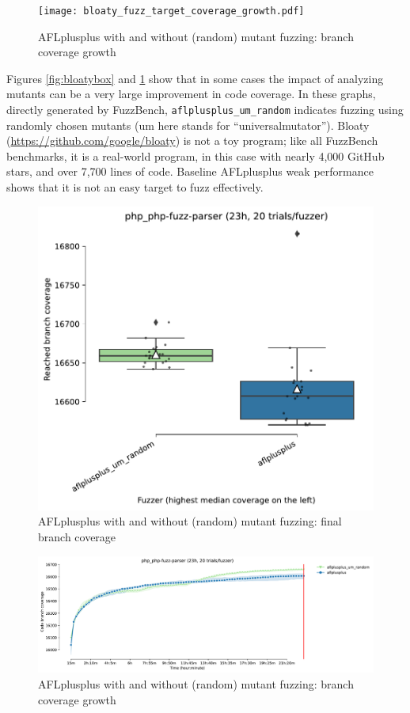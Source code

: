 \begin{figure}
  \texttt{[image: bloaty\_fuzz\_target\_coverage\_growth.pdf]}
  \caption{AFLplusplus with and without (random) mutant fuzzing: branch coverage growth}
  \label{fig:bloatygrowth}  
  \end{figure}

  Figures \ref{fig:bloatybox} and \ref{fig:bloatygrowth} show that in some cases the impact of analyzing mutants can be a very large improvement in code coverage.  In these graphs, directly generated by FuzzBench, {\tt aflplusplus\_um\_random} indicates fuzzing using randomly chosen mutants (um here stands for ``universalmutator'').
Bloaty (\url{https://github.com/google/bloaty}) is not a toy program; like all FuzzBench benchmarks, it is a real-world program, in this case with nearly 4,000 GitHub stars, and over 7,700 lines of code.  Baseline AFLplusplus weak performance shows that it is not an easy target to fuzz effectively.

\begin{figure}
  \includegraphics[width=0.75\columnwidth]{php_php-fuzz-parser_boxplot.pdf}
  \caption{AFLplusplus with and without (random) mutant fuzzing: final branch coverage}
  \label{fig:phpbox}
  
\end{figure}

\begin{figure}
  \includegraphics[width=0.75\columnwidth]{php_php-fuzz-parser_coverage_growth.pdf}
  \caption{AFLplusplus with and without (random) mutant fuzzing: branch coverage growth}
  \label{fig:phpgrowth}  
\end{figure}

